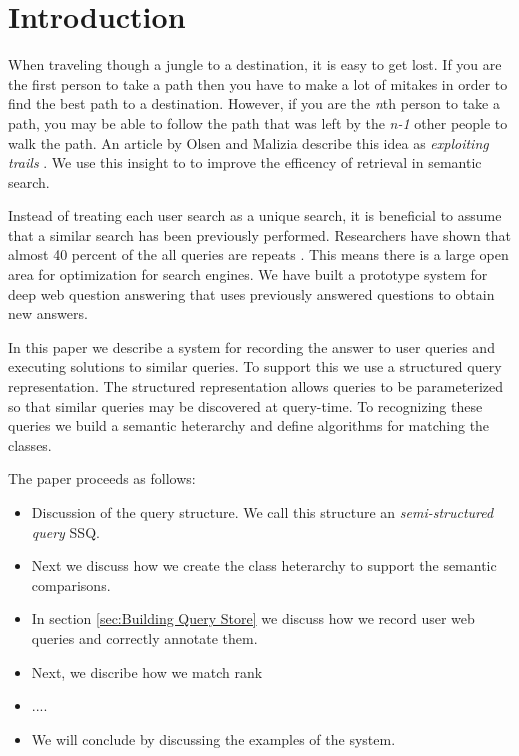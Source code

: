 \section{Introduction}
When traveling though a jungle to a destination, it is easy to get lost.  If you are the first person to take a path then you have to make a lot of mitakes in order to find the best path to a destination.  However, if you are the \emph{n}th person to take a path, you may be able to follow the path that was left by the \emph{n-1} other people to walk the path.  An article by Olsen and Malizia describe this idea as \emph{exploiting trails} \cite{5379671}.  We use this insight to to improve the efficency of retrieval in semantic search.

Instead of treating each user search as a unique search, it is beneficial to assume that a similar search has been previously performed.  Researchers have shown that almost 40 percent of the all queries are repeats \cite{1277770}.  This means there is a large open area for optimization for search engines.  We have built a prototype system for deep web question answering that uses previously answered questions to obtain new answers.

In this paper we describe a system for recording the answer to user queries and executing solutions to similar queries.  To support this we use a structured query representation.  The structured representation allows queries to be parameterized so that similar queries may be discovered at query-time.  To recognizing these queries we build a semantic heterarchy and define algorithms for matching the classes.

The paper proceeds as follows:
\begin{itemize}
\item Discussion of the query structure.  We call this structure an \emph{semi-structured query} SSQ.
\item Next we discuss how we create the class heterarchy to support the semantic comparisons.
\item In section \ref{sec:Building Query Store} we discuss how we record user web queries and correctly annotate them.
\item Next, we discribe how we match rank 
\item ....
\item We will conclude by discussing the examples of the system.
\end{itemize}
